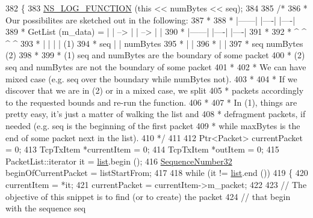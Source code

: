 \begin{DoxyCode}
382 \{
383   \hyperlink{log-macros-disabled_8h_a90b90d5bad1f39cb1b64923ea94c0761}{NS\_LOG\_FUNCTION} (\textcolor{keyword}{this} << numBytes << seq);
384 
385   \textcolor{comment}{/*}
386 \textcolor{comment}{   * Our possibilites are sketched out in the following:}
387 \textcolor{comment}{   *}
388 \textcolor{comment}{   *                    |------|     |----|     |----|}
389 \textcolor{comment}{   * GetList (m\_data) = |      | --> |    | --> |    |}
390 \textcolor{comment}{   *                    |------|     |----|     |----|}
391 \textcolor{comment}{   *}
392 \textcolor{comment}{   *                    ^ ^ ^  ^}
393 \textcolor{comment}{   *                    | | |  |         (1)}
394 \textcolor{comment}{   *                  seq | |  numBytes}
395 \textcolor{comment}{   *                      | |}
396 \textcolor{comment}{   *                      | |}
397 \textcolor{comment}{   *                    seq numBytes     (2)}
398 \textcolor{comment}{   *}
399 \textcolor{comment}{   * (1) seq and numBytes are the boundary of some packet}
400 \textcolor{comment}{   * (2) seq and numBytes are not the boundary of some packet}
401 \textcolor{comment}{   *}
402 \textcolor{comment}{   * We can have mixed case (e.g. seq over the boundary while numBytes not).}
403 \textcolor{comment}{   *}
404 \textcolor{comment}{   * If we discover that we are in (2) or in a mixed case, we split}
405 \textcolor{comment}{   * packets accordingly to the requested bounds and re-run the function.}
406 \textcolor{comment}{   *}
407 \textcolor{comment}{   * In (1), things are pretty easy, it's just a matter of walking the list and}
408 \textcolor{comment}{   * defragment packets, if needed (e.g. seq is the beginning of the first packet}
409 \textcolor{comment}{   * while maxBytes is the end of some packet next in the list).}
410 \textcolor{comment}{   */}
411 
412   Ptr<Packet> currentPacket = 0;
413   TcpTxItem *currentItem = 0;
414   TcpTxItem *outItem = 0;
415   PacketList::iterator it = \hyperlink{openflow-interface_8h_afd9bcfa176617760671b67580f536fa7}{list}.begin ();
416   \hyperlink{group__network_gacb2070e4e98d2d5135c9bede58f07a03}{SequenceNumber32} beginOfCurrentPacket = listStartFrom;
417 
418   \textcolor{keywordflow}{while} (it != \hyperlink{openflow-interface_8h_afd9bcfa176617760671b67580f536fa7}{list}.end ())
419     \{
420       currentItem = *it;
421       currentPacket = currentItem->m\_packet;
422 
423       \textcolor{comment}{// The objective of this snippet is to find (or to create) the packet}
424       \textcolor{comment}{// that begin with the sequence seq}

\end{DoxyCode}
